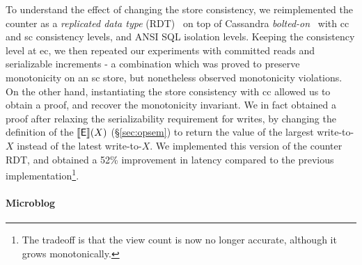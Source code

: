 To understand the effect of changing the store consistency, we
reimplemented the counter as a \emph{replicated data type}
(RDT)~\cite{crdt,burckhardt14} on top of Cassandra
\emph{bolted-on}~\cite{bailisbolton} with {\sc cc} and {\sc sc}
consistency levels, and ANSI SQL isolation levels. Keeping the
consistency level at {\sc ec}, we then repeated our experiments with
committed reads and serializable increments - a combination which was
proved to preserve monotonicity on an {\sc sc} store, but nonetheless
observed monotonicity violations. On the other hand, instantiating the
store consistency with {\sc cc} allowed us to obtain a proof, and
recover the monotonicity invariant. We in fact obtained a proof after
relaxing the serializability requirement for writes, by changing the
definition of the $\llbracket \textsf{E} \rrbracket(X)$ (\S\ref{sec:opsem}) to return the
value of the largest write-to-$X$ instead of the latest write-to-$X$.
We implemented this version of the counter RDT, and obtained a 52\%
improvement in latency compared to the previous
implementation\footnote{The tradeoff is that the view count is now no
longer accurate, although it grows monotonically.}.

\paragraph{Microblog}

